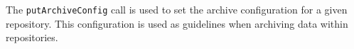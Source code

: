 The \verb+putArchiveConfig+ call is used to set the archive configuration for a given repository. This configuration
is used as guidelines when archiving data within repositories.
